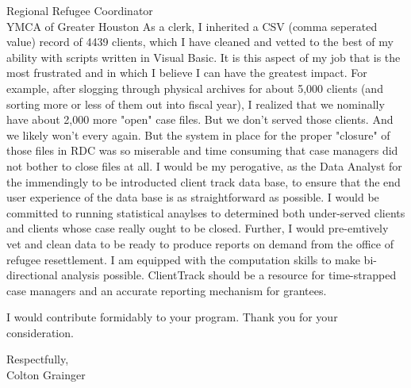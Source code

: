 \documentclass[10pt]{letter}
\begin{document}
\begin{letter}{
Regional Refugee Coordinator\\
YMCA of Greater Houston
}
	As a clerk, I inherited a CSV (comma seperated value) record of 4439 clients, which I have cleaned and vetted to the best of my ability with scripts written in Visual Basic. It is this aspect of my job that is the most frustrated and in which I believe I can have the greatest impact. For example, after slogging through physical archives for about 5,000 clients (and sorting more or less of them out into fiscal year), I realized that we nominally have about 2,000 more "open" case files. But we don't served those clients. And we likely won't every again. But the system in place for the proper "closure" of those files in RDC was so miserable and time consuming that case managers did not bother to close files at all. I would be my perogative, as the Data Analyst for the immendingly to be introducted client track data base, to ensure that the end user experience of the data base is as straightforward as possible. I would be committed to running statistical anaylses to determined both under-served clients and clients whose case really ought to be closed. Further, I would pre-emtively vet and clean data to be ready to produce reports on demand from the office of refugee resettlement. I am equipped with the computation skills to make bi-directional analysis possible. ClientTrack should be a resource for time-strapped case managers and an accurate reporting mechanism for grantees.

I would contribute formidably to your program. Thank you for your consideration.

\closing{Respectfully,\\Colton Grainger}
\end{letter}
\end{document}
